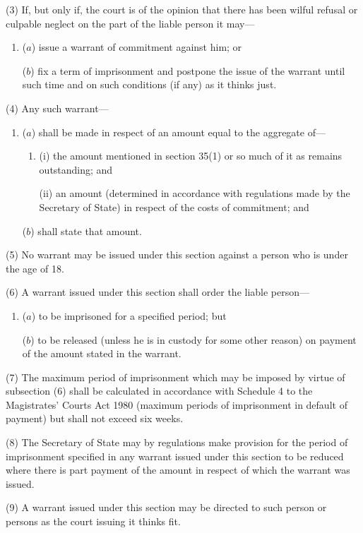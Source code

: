 \documentclass[12pt,a4paper]{article}
\begin{document}
(3) If, but only if, the court is of the opinion that there has been wilful refusal or culpable neglect on the part of the liable person it may—
\begin{enumerate}\item[]
($a$) issue a warrant of commitment against him; or

($b$) fix a term of imprisonment and postpone the issue of the warrant until such time and on such conditions (if any) as it thinks just.
\end{enumerate}

(4) Any such warrant—
\begin{enumerate}\item[]
($a$) shall be made in respect of an amount equal to the aggregate of—
\begin{enumerate}\item[]
(i) the amount mentioned in section 35(1)  or so much of it as remains outstanding; and

(ii) an amount (determined in accordance with regulations made by the Secretary of State) in respect of the costs of commitment; and
\end{enumerate}

($b$) shall state that amount.
\end{enumerate}

(5) No warrant may be issued under this section against a person who is under the age of 18.

(6) A warrant issued under this section shall order the liable person—
\begin{enumerate}\item[]
($a$) to be imprisoned for a specified period; but

($b$) to be released (unless he is in custody for some other reason) on payment of the amount stated in the warrant.
\end{enumerate}

(7) The maximum period of imprisonment which may be imposed by virtue of subsection (6)  shall be calculated in accordance with Schedule 4 to the Magistrates' Courts Act 1980 (maximum periods of imprisonment in default of payment) but shall not exceed six weeks.

(8) The Secretary of State may by regulations make provision for the period of imprisonment specified in any warrant issued under this section to be reduced where there is part payment of the amount in respect of which the warrant was issued.

(9) A warrant issued under this section may be directed to such person or persons as the court issuing it thinks fit.
\end{document}
